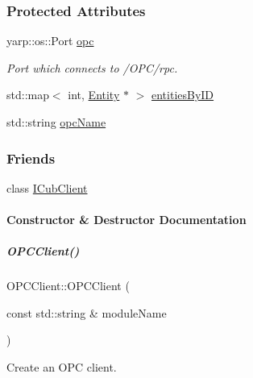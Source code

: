 \subsubsection*{Protected Attributes}
\begin{DoxyCompactItemize}
\item 
yarp\+::os\+::\+Port \hyperlink{group__icubclient__clients_adf399e85f0cccebc9e95a7863bb62aba}{opc}
\begin{DoxyCompactList}\small\item\em Port which connects to /\+O\+P\+C/rpc. \end{DoxyCompactList}\item 
std\+::map$<$ int, \hyperlink{group__icubclient__representations_classicubclient_1_1Entity}{Entity} $\ast$ $>$ \hyperlink{group__icubclient__clients_acd1fedcd96e9cc5a766bfe72484cad46}{entities\+By\+ID}
\item 
std\+::string \hyperlink{group__icubclient__clients_aaa18459f611f4c14b7e3a197d7ce9b7a}{opc\+Name}
\end{DoxyCompactItemize}
\subsubsection*{Friends}
\begin{DoxyCompactItemize}
\item 
class \hyperlink{group__icubclient__clients_a56c42753f30380d8abf4a96bc322b3b0}{I\+Cub\+Client}
\end{DoxyCompactItemize}


\paragraph{Constructor \& Destructor Documentation}
\mbox{\label{group__icubclient__clients_a9c46e911dfd3ddb68f79d7601355329a}} 
\subparagraph{\texorpdfstring{O\+P\+C\+Client()}{OPCClient()}}
{\footnotesize\ttfamily O\+P\+C\+Client\+::\+O\+P\+C\+Client (\begin{DoxyParamCaption}\item[{const std\+::string \&}]{module\+Name }\end{DoxyParamCaption})}



Create an O\+PC client. 


